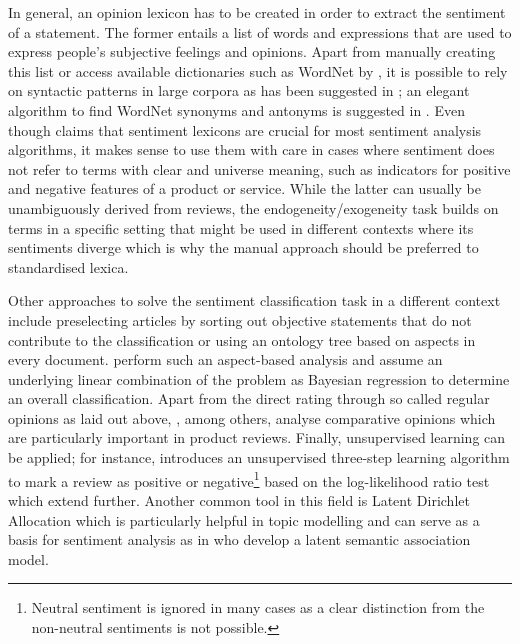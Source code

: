 In general, an opinion lexicon has to be created in order to extract the sentiment of a statement. The former entails a list of words and expressions that are used to express people's subjective feelings and opinions. Apart from manually creating this list or access available dictionaries such as WordNet\textsuperscript{\textregistered} by \textcite{Fellbaum.1998,Esuli.2006}, it is possible to rely on syntactic patterns in large corpora as has been suggested in \textcite{Ding.2008,Hatzivassiloglou.1997,Kanayama.2006,Turney.2002,Yu.2003}; an elegant algorithm to find WordNet\textsuperscript{\textregistered} synonyms and antonyms is suggested in \textcite{Kamps.2004}. Even though \textcite{Feldman.2013} claims that sentiment lexicons are crucial for most sentiment analysis algorithms, it makes sense to use them with care in cases where sentiment does not refer to terms with clear and universe meaning, such as indicators for positive and negative features of a product or service. While the latter can usually be unambiguously derived from reviews, the endogeneity/exogeneity task builds on terms in a specific setting that might be used in different contexts where its sentiments diverge which is why the manual approach should be preferred to standardised lexica. 

Other approaches to solve the sentiment classification task in a different context include preselecting articles by sorting out objective statements that do not contribute to the classification \parencite{Wiebe.1999} or using an ontology tree based on aspects in every document. \textcite{Wang.2010} perform such an aspect-based analysis and assume an underlying linear combination of the problem as Bayesian regression to determine an overall classification. Apart from the direct rating through so called regular opinions as laid out above, \textcite{Ding.2009,Ganapathibhotla.2008,Jindal.2006}, among others, analyse comparative opinions which are particularly important in product reviews. Finally, unsupervised learning can be applied; for instance, \textcite{Turney.2002} introduces an unsupervised three-step learning algorithm to mark a review as positive or negative\footnote{Neutral sentiment is ignored in many cases as a clear distinction from the non-neutral sentiments is not possible.} based on the log-likelihood ratio test which \textcite{Yu.2003} extend further. Another common tool in this field is Latent Dirichlet Allocation \parencite{Blei.2003} which is particularly helpful in topic modelling and can serve as a basis for sentiment analysis as in \textcite{Guo.2009} who develop a latent semantic association model.
%
